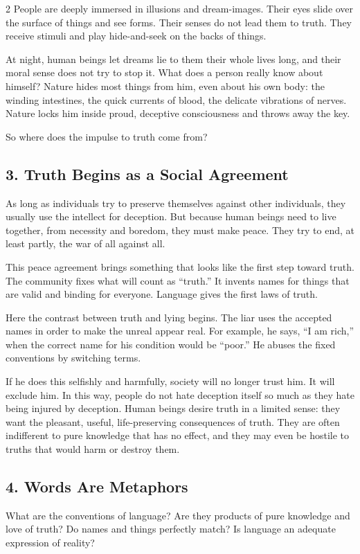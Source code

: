 \documentclass[12pt]{article}
\begin{document}
\begin{multicols}{2}
People are deeply immersed in illusions and dream-images. Their eyes slide over the surface of things and see forms. Their senses do not lead them to truth. They receive stimuli and play hide-and-seek on the backs of things.

At night, human beings let dreams lie to them their whole lives long, and their moral sense does not try to stop it. What does a person really know about himself? Nature hides most things from him, even about his own body: the winding intestines, the quick currents of blood, the delicate vibrations of nerves. Nature locks him inside proud, deceptive consciousness and throws away the key.

So where does the impulse to truth come from?

\subsection*{3. Truth Begins as a Social Agreement}
As long as individuals try to preserve themselves against other individuals, they usually use the intellect for deception. But because human beings need to live together, from necessity and boredom, they must make peace. They try to end, at least partly, the war of all against all.

This peace agreement brings something that looks like the first step toward truth. The community fixes what will count as ``truth.'' It invents names for things that are valid and binding for everyone. Language gives the first laws of truth.

Here the contrast between truth and lying begins. The liar uses the accepted names in order to make the unreal appear real. For example, he says, ``I am rich,'' when the correct name for his condition would be ``poor.'' He abuses the fixed conventions by switching terms.

If he does this selfishly and harmfully, society will no longer trust him. It will exclude him. In this way, people do not hate deception itself so much as they hate being injured by deception. Human beings desire truth in a limited sense: they want the pleasant, useful, life-preserving consequences of truth. They are often indifferent to pure knowledge that has no effect, and they may even be hostile to truths that would harm or destroy them.

\subsection*{4. Words Are Metaphors}
What are the conventions of language? Are they products of pure knowledge and love of truth? Do names and things perfectly match? Is language an adequate expression of reality?


\end{multicols}
\end{document}
